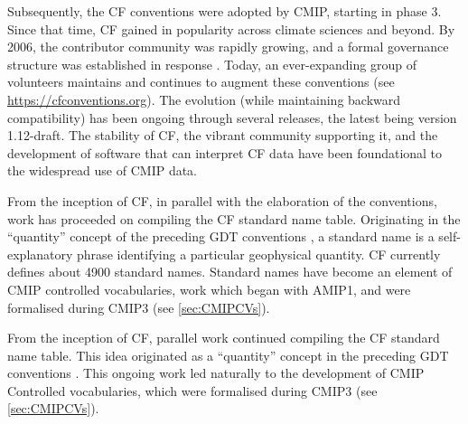 \documentclass[manuscript]{copernicus}
\newcommand{\mycomment}[1]{}
\begin{document}
Subsequently, the CF conventions were adopted by CMIP, starting in phase 3. Since that time, CF gained in popularity across climate sciences and beyond. By 2006, the contributor community was rapidly growing, and a formal governance structure was established in response \citep{lawrence_maintaining_2006}. Today, an ever-expanding group of volunteers maintains and continues to augment these conventions (see \url{https://cfconventions.org}). The evolution (while maintaining backward compatibility) has been ongoing through several releases, the latest being version 1.12-draft. The stability of CF, the vibrant community supporting it, and the development of software that can interpret CF data have been foundational to the widespread use of CMIP data.

From the inception of CF, in parallel with the elaboration of the conventions, work has proceeded on compiling the CF standard name table. Originating in the ``quantity'' concept of the preceding GDT conventions \citep{gregory_gdt_1999}, a standard name is a self-explanatory phrase identifying a particular geophysical quantity. CF currently defines about 4900 standard names. Standard names have become an element of CMIP controlled vocabularies, work which began with AMIP1, and were formalised during CMIP3 (see \autoref{sec:CMIPCVs}).

From the inception of CF, parallel work continued compiling the CF standard name table. This idea originated as a ``quantity'' concept in the preceding GDT conventions \citep{gregory_gdt_1999}. This ongoing work led naturally to the development of CMIP Controlled vocabularies, which were formalised during CMIP3 (see \autoref{sec:CMIPCVs}).

\mycomment{
https://www.unidata.ucar.edu/software/netcdf/conventions.html
https://www.unidata.ucar.edu/software/netcdf/coords/proposals.html
COARDS 1995 - https://web.archive.org/web/20100527095818/http://ferret.wrc.noaa.gov/noaa_coop/coop_cdf_profile.html
GDT 1997
https://www.unidata.ucar.edu/mailing_lists/archives/netcdfgroup/1997/msg00080.html
https://www.unidata.ucar.edu/software/netcdf/coords/0054.html 1997
https://web.archive.org/web/20100610102527/http://www-pcmdi.llnl.gov/drach/GDT_convention.html 1999
https://web.archive.org/web/20040604041414/http://www-pcmdi.llnl.gov/drach/netCDF.html
CF 2003 - https://cfconventions.org/Data/cf-conventions/cf-conventions-1.11/cf-conventions.html#_version_1_0_28_october_2003 
}
\end{document}
